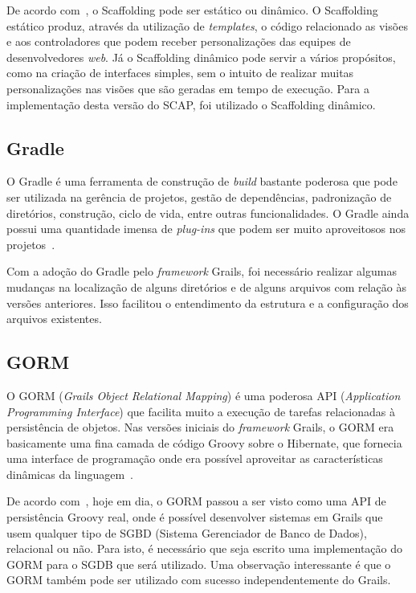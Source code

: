 De acordo com~, o Scaffolding pode ser estático ou dinâmico. O Scaffolding estático produz, através da utilização de \textit{templates}, o código relacionado as visões e aos controladores que podem receber personalizações das equipes de desenvolvedores \textit{web}. Já o Scaffolding dinâmico pode servir a vários propósitos, como na criação de interfaces simples, sem o intuito de realizar muitas personalizações nas visões que são geradas em tempo de execução. Para a implementação desta versão do SCAP, foi utilizado o Scaffolding dinâmico.   

\subsection{Gradle}
\label{sec-projeto-gradle}

O Gradle é uma ferramenta de construção de \textit{build} bastante poderosa que pode ser utilizada na gerência de projetos, gestão de dependências, padronização de diretórios, construção, ciclo de vida, entre outras funcionalidades. O Gradle ainda possui uma quantidade imensa de \textit{plug-ins} que podem ser muito aproveitosos nos projetos~\cite{weissmann:fgapdw15}.

Com a adoção do Gradle pelo \textit{framework} Grails, foi necessário realizar algumas mudanças na localização de alguns diretórios e de alguns arquivos com relação às versões anteriores. Isso facilitou o entendimento da estrutura e a configuração dos arquivos existentes.

\subsection{GORM}
\label{sec-projeto-gorm}

O GORM (\textit{Grails Object Relational Mapping}) é uma poderosa API (\textit{Application Programming Interface}) que facilita muito a execução de tarefas relacionadas à persistência de objetos. Nas versões iniciais do \textit{framework} Grails, o GORM era basicamente uma fina camada de código Groovy sobre o Hibernate, que fornecia uma interface de programação onde era possível aproveitar as características dinâmicas da linguagem~\cite{weissmann:fgapdw15}.

De acordo com~, hoje em dia, o GORM passou a ser visto como uma API de persistência Groovy real, onde é possível desenvolver sistemas em Grails que usem qualquer tipo de SGBD (Sistema Gerenciador de Banco de Dados), relacional ou não. Para isto, é necessário que seja escrito uma implementação do GORM para o SGDB que será utilizado. Uma observação interessante é que o GORM também pode ser utilizado com sucesso independentemente do Grails.  

